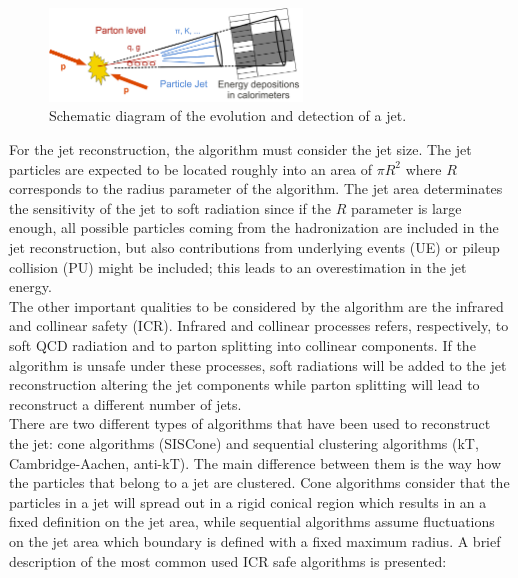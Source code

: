 \begin{figure}[ht]
  \begin{center}
    \includegraphics[width=0.6\textwidth]{figuras/Chapter3/JetSketch.png}
    \caption{Schematic diagram of the evolution and detection of a jet.}
    \label{fig:JetScketch}
  \end{center}
\end{figure}



For the jet reconstruction, the algorithm must consider the jet size. The jet particles are expected to be located 
roughly into an area of $\pi R^{2}$ where $R$ corresponds to the radius parameter of the algorithm. The jet 
area determinates the sensitivity of the jet to soft radiation since if the $R$ parameter is large enough,
all possible particles coming from the hadronization are included in the jet reconstruction,
but also contributions from underlying events (UE) or pileup collision (PU) might be included; this leads to 
an overestimation in the jet energy. \\

The other important qualities to be considered by the algorithm are the infrared and collinear safety (ICR). Infrared 
and collinear processes refers, respectively, to soft QCD radiation and to parton splitting into collinear 
components. If the algorithm is unsafe under these processes, soft radiations will be added to the jet reconstruction
altering the jet components while parton splitting will lead to reconstruct a different number of jets.\\

There are two different types of algorithms that have been used to reconstruct the jet: cone algorithms (SISCone)
and sequential clustering algorithms (kT, Cambridge-Aachen, anti-kT). The main difference between them 
is the way how the particles that belong to a jet are clustered. Cone algorithms consider that the particles 
in a jet will spread out in a rigid conical region which results in an a fixed definition on the jet area, while 
sequential algorithms assume fluctuations on the jet area which boundary is defined with a fixed maximum radius. 
A brief description of the most common used ICR safe algorithms is presented:

